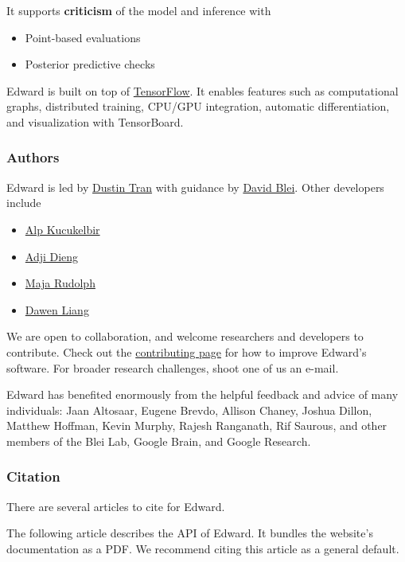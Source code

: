It supports \textbf{criticism} of the model and inference with

\begin{itemize}
\item Point-based evaluations
\item Posterior predictive checks
\end{itemize}

Edward is built on top of
\href{https://www.tensorflow.org}{TensorFlow}. It enables features such
as computational graphs, distributed training, CPU/GPU integration,
automatic differentiation, and visualization with TensorBoard.

\subsubsection{Authors}

Edward is led by \href{http://dustintran.com}{Dustin Tran} with guidance
by \href{http://www.cs.columbia.edu/~blei/}{David Blei}. Other developers
include
\begin{itemize}
  \item \href{http://www.proditus.com/}{Alp Kucukelbir}
  \item \href{http://stat.columbia.edu/~diengadji/}{Adji Dieng}
  \item \href{http://maja-rita-rudolph.com/}{Maja Rudolph}
  \item \href{http://www.ee.columbia.edu/~dliang/}{Dawen Liang}
\end{itemize}
We are open to collaboration, and welcome
researchers and developers to contribute. Check out the
\href{/contributing}{contributing page} for how to improve Edward's software.
For broader research challenges, shoot one of us an e-mail.

Edward has benefited enormously from the helpful feedback and advice
of many individuals: Jaan Altosaar, Eugene Brevdo, Allison Chaney,
Joshua Dillon, Matthew Hoffman, Kevin Murphy, Rajesh Ranganath, Rif
Saurous, and other members of the Blei Lab, Google Brain, and Google
Research.

\subsubsection{Citation}

There are several articles to cite for Edward.

The following article describes the API of Edward. It bundles the
website's documentation as a PDF.
We recommend citing this article as a general default.

